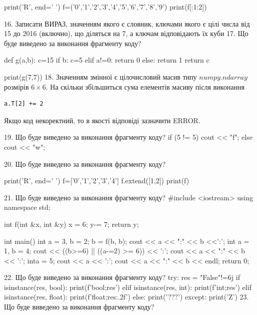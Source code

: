 \documentclass[11pt]{article}
\begin{document}
print('R', end=' ')
f=('0','1','2','3','4','5','6','7','8','9')
print(f[:1:2])

\vspace{5mm}
16. 
Записати ВИРАЗ, значенням якого є словник, ключами якого є цілі числа від 15 до 2016 (включно), що діляться на 7, а ключам відповідають їх куби \vspace{5mm}
17. Що буде виведено за виконання фрагменту коду?

def g(a,b):
    c=15
    if b:
        c=5
    elif a!=0:
         return 0
    else: 
        return 1
    return c

print(g(7,7))\vspace{5mm}
18. 
Значенням змінної  є цілочисловий масив типу $numpy.ndarray$ розмірів $6{\times}6$. На скільки збільшиться сума елементів масиву  після виконання
\begin{verbatim}
a.T[2] += 2
\end{verbatim}


Якщо код некоректний, то в якості відповіді зазначити ERROR.


\vspace{5mm}
19. Що буде виведено за виконання фрагменту коду?
if (5 != 5)
    cout << "f";
else
    cout << "w";

\vspace{5mm}
20. Що буде виведено за виконання фрагменту коду?

print('R', end=' ')
f=['0','1','2','3','4']
f.extend([1,2])
print(f)

\vspace{5mm}
21. Що буде виведено за виконання фрагменту коду?
#include <iostream>
using namespace std;

int f(int &x, int &y){
    x = 6;
    y-= 7;
    return y;
}

int main(){
    int a = 3, b = 2;
    b = f(b, b);
    cout << a << ":" << b <<':';
    {
        int a = 1, b = 4;
        cout << ((b>=6) || ((a-=2) >= 6)) << ':';
        cout << a << ":" << b << ':';
    }
    {
        inta = 5;
        cout << a << ':';
    }
    cout << a << ":" << b << endl;
    return 0;
}

\vspace{5mm}
22. Що буде виведено за виконання фрагменту коду?
try:
    res = "False"!=6j
    if isinstance(res, bool):
        print(f'bool;{res}')
    elif isinstance(res, int):
        print(f'int;{res}')
    elif isinstance(res, float):
        print(f'float;{res:.2f}')
    else:
        print('???')
except:
    print('Z')
\vspace{5mm}
23. Що буде виведено за виконання фрагменту коду?
\end{document}
